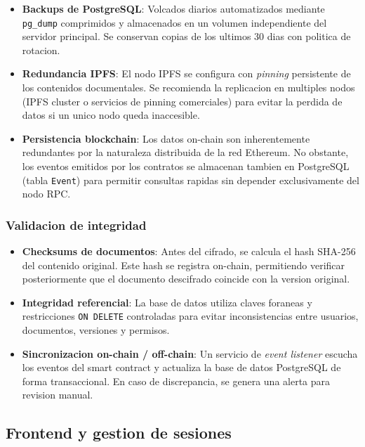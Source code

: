 \documentclass[11pt, a4paper]{article}
\begin{document}
\begin{itemize}
    \item \textbf{Backups de PostgreSQL}: Volcados diarios automatizados mediante \texttt{pg\_dump} comprimidos y almacenados en un volumen independiente del servidor principal. Se conservan copias de los ultimos 30 dias con politica de rotacion.
    \item \textbf{Redundancia IPFS}: El nodo IPFS se configura con \textit{pinning} persistente de los contenidos documentales. Se recomienda la replicacion en multiples nodos (IPFS cluster o servicios de pinning comerciales) para evitar la perdida de datos si un unico nodo queda inaccesible.
    \item \textbf{Persistencia blockchain}: Los datos on-chain son inherentemente redundantes por la naturaleza distribuida de la red Ethereum. No obstante, los eventos emitidos por los contratos se almacenan tambien en PostgreSQL (tabla \texttt{Event}) para permitir consultas rapidas sin depender exclusivamente del nodo RPC.
\end{itemize}

\subsubsection{Validacion de integridad}

\begin{itemize}
    \item \textbf{Checksums de documentos}: Antes del cifrado, se calcula el hash SHA-256 del contenido original. Este hash se registra on-chain, permitiendo verificar posteriormente que el documento descifrado coincide con la version original.
    \item \textbf{Integridad referencial}: La base de datos utiliza claves foraneas y restricciones \texttt{ON DELETE} controladas para evitar inconsistencias entre usuarios, documentos, versiones y permisos.
    \item \textbf{Sincronizacion on-chain / off-chain}: Un servicio de \textit{event listener} escucha los eventos del smart contract y actualiza la base de datos PostgreSQL de forma transaccional. En caso de discrepancia, se genera una alerta para revision manual.
\end{itemize}

\subsection{Frontend y gestion de sesiones}
\end{document}

